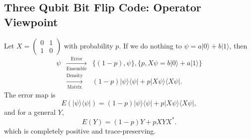 \documentclass[12pt]{article}
\theoremstyle{definition}
\begin{document}
\subsection{Three Qubit Bit Flip Code: Operator Viewpoint}

Let $X=\begin{pmatrix}0 & 1\\ 1 & 0\end{pmatrix}$ with probability $p$. If we do nothing to $\psi=a|0\rangle+b|1\rangle$, then
\[
\begin{array}{rcl}
\psi & \xrightarrow[\text{Ensemble}]{\text{Error}} & \{(1-p),\psi\}, \{p,X\psi=b|0\rangle+a|1\rangle\} \\
& \xrightarrow[\text{Matrix}] {\text{Density}} & (1-p)|\psi\rangle\langle \psi| + p|X\psi\rangle\langle X\psi|.
\end{array}
\]
The error map is
\[
E(|\psi\rangle\langle \psi|)=(1-p)|\psi\rangle\langle \psi| + p|X\psi\rangle\langle X\psi|,
\]
and for a general $Y$,
\[
E(Y)=(1-p)Y+pXYX^*.
\]
which is completely positive and trace-preserving.
\end{document}
